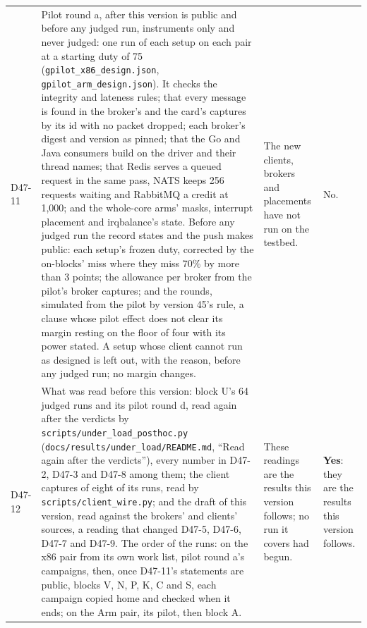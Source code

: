 \documentclass[11pt]{article}
\begin{document}
{\begin{longtable}{@{}p{1.1cm} >{\raggedright\arraybackslash}p{6.1cm} >{\raggedright\arraybackslash}p{6.0cm} >{\raggedright\arraybackslash}p{2.2cm}@{}}
D47-11 & Pilot round a, after this version is public and before any judged run, instruments only and never judged: one run of each setup on each pair at a starting duty of 75 (\texttt{gpilot\_x86\_design.json}, \texttt{gpilot\_arm\_design.json}). It checks the integrity and lateness rules; that every message is found in the broker's and the card's captures by its id with no packet dropped; each broker's digest and version as pinned; that the Go and Java consumers build on the driver and their thread names; that Redis serves a queued request in the same pass, NATS keeps 256 requests waiting and RabbitMQ a credit at 1,000; and the whole-core arms' masks, interrupt placement and irqbalance's state. Before any judged run the record states and the push makes public: each setup's frozen duty, corrected by the on-blocks' miss where they miss 70\% by more than 3 points; the allowance per broker from the pilot's broker captures; and the rounds, simulated from the pilot by version 45's rule, a clause whose pilot effect does not clear its margin resting on the floor of four with its power stated. A setup whose client cannot run as designed is left out, with the reason, before any judged run; no margin changes. & The new clients, brokers and placements have not run on the testbed. & No. \\
D47-12 & What was read before this version: block U's 64 judged runs and its pilot round d, read again after the verdicts by \texttt{scripts/under\_load\_posthoc.py} (\texttt{docs/results/under\_load/}\allowbreak\texttt{README.md}, ``Read again after the verdicts''), every number in D47-2, D47-3 and D47-8 among them; the client captures of eight of its runs, read by \texttt{scripts/client\_wire.py}; and the draft of this version, read against the brokers' and clients' sources, a reading that changed D47-5, D47-6, D47-7 and D47-9. The order of the runs: on the x86 pair from its own work list, pilot round a's campaigns, then, once D47-11's statements are public, blocks V, N, P, K, C and S, each campaign copied home and checked when it ends; on the Arm pair, its pilot, then block A. & These readings are the results this version follows; no run it covers had begun. & \textbf{Yes}: they are the results this version follows. \\
\bottomrule
\end{longtable}}
\end{document}
